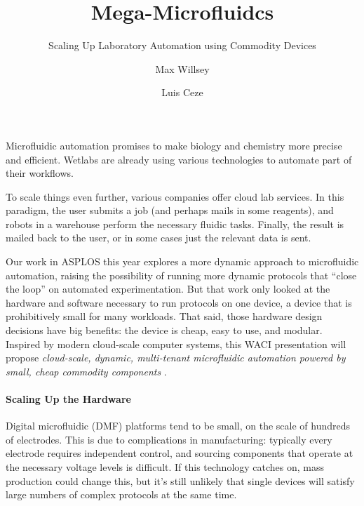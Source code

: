 \documentclass[sigplan, screen, nonacm]{acmart}
\title{Mega-Microfluidcs}
\subtitle{Scaling Up Laboratory Automation using Commodity Devices}
\author{Max Willsey}
\affiliation{University of Washington}
\author{Luis Ceze}
\affiliation{University of Washington}
\begin{document}
\begin{teaserfigure}
  \hfill
{}
  \hfill
\vspace{1em}
\end{teaserfigure}

\maketitle

Microfluidic automation promises to make biology and chemistry more precise and efficient.
Wetlabs are already using various technologies to automate part of their workflows.

To scale things even further, various companies offer cloud lab services.
In this paradigm, the user submits a job (and perhaps mails in some reagents), and robots in a warehouse perform the necessary fluidic tasks.
Finally, the result is mailed back to the user, or in some cases just the relevant data is sent.

Our work in ASPLOS this year explores a more dynamic approach to microfluidic automation, raising the possibility of running more dynamic protocols that ``close the loop'' on automated experimentation. 
But that work only looked at the hardware and software necessary to run protocols on one device, a device that is prohibitively small for many workloads.
That said, those hardware design decisions have big benefits: the device is cheap, easy to use, and modular.
Inspired by modern cloud-scale computer systems, this WACI presentation will propose 
\emph{
  cloud-scale, dynamic, multi-tenant microfluidic automation 
  powered by small, cheap commodity components
}.


\paragraph{Scaling Up the Hardware}
Digital microfluidic (DMF) platforms tend to be small, on the scale of hundreds of electrodes. 
This is due to complications in manufacturing: typically every electrode requires independent control, and sourcing components that operate at the necessary voltage levels is difficult.
If this technology catches on, mass production could change this, but it's still unlikely that single devices will satisfy large numbers of complex protocols at the same time.
\end{document}

